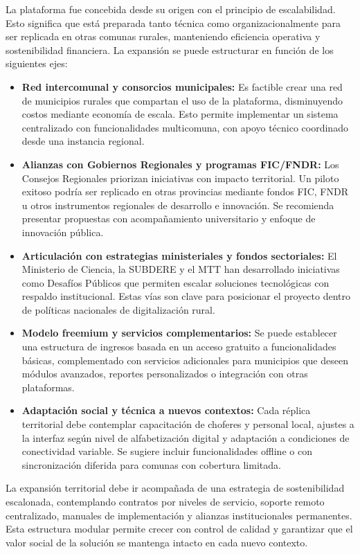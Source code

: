 \documentclass[12pt]{article}
\begin{document}
La plataforma fue concebida desde su origen con el principio de escalabilidad. Esto significa que está preparada tanto técnica como organizacionalmente para ser replicada en otras comunas rurales, manteniendo eficiencia operativa y sostenibilidad financiera. La expansión se puede estructurar en función de los siguientes ejes:

\begin{itemize}
    \item \textbf{Red intercomunal y consorcios municipales:} Es factible crear una red de municipios rurales que compartan el uso de la plataforma, disminuyendo costos mediante economía de escala. Esto permite implementar un sistema centralizado con funcionalidades multicomuna, con apoyo técnico coordinado desde una instancia regional.
    \item \textbf{Alianzas con Gobiernos Regionales y programas FIC/FNDR:} Los Consejos Regionales priorizan iniciativas con impacto territorial. Un piloto exitoso podría ser replicado en otras provincias mediante fondos FIC, FNDR u otros instrumentos regionales de desarrollo e innovación. Se recomienda presentar propuestas con acompañamiento universitario y enfoque de innovación pública.
    \item \textbf{Articulación con estrategias ministeriales y fondos sectoriales:} El Ministerio de Ciencia, la SUBDERE y el MTT han desarrollado iniciativas como Desafíos Públicos que permiten escalar soluciones tecnológicas con respaldo institucional. Estas vías son clave para posicionar el proyecto dentro de políticas nacionales de digitalización rural.
    \item \textbf{Modelo freemium y servicios complementarios:} Se puede establecer una estructura de ingresos basada en un acceso gratuito a funcionalidades básicas, complementado con servicios adicionales para municipios que deseen módulos avanzados, reportes personalizados o integración con otras plataformas.
    \item \textbf{Adaptación social y técnica a nuevos contextos:} Cada réplica territorial debe contemplar capacitación de choferes y personal local, ajustes a la interfaz según nivel de alfabetización digital y adaptación a condiciones de conectividad variable. Se sugiere incluir funcionalidades offline o con sincronización diferida para comunas con cobertura limitada.
\end{itemize}
La expansión territorial debe ir acompañada de una estrategia de sostenibilidad escalonada, contemplando contratos por niveles de servicio, soporte remoto centralizado, manuales de implementación y alianzas institucionales permanentes. Esta estructura modular permite crecer con control de calidad y garantizar que el valor social de la solución se mantenga intacto en cada nuevo contexto.
\end{document}
